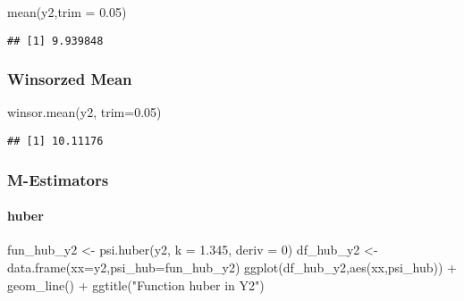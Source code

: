 \documentclass[
]{article}
\newenvironment{Shaded}{\begin{snugshade}}{\end{snugshade}}
\newcommand{\AttributeTok}[1]{\textcolor[rgb]{0.77,0.63,0.00}{#1}}
\newcommand{\DecValTok}[1]{\textcolor[rgb]{0.00,0.00,0.81}{#1}}
\newcommand{\FloatTok}[1]{\textcolor[rgb]{0.00,0.00,0.81}{#1}}
\newcommand{\FunctionTok}[1]{\textcolor[rgb]{0.00,0.00,0.00}{#1}}
\newcommand{\NormalTok}[1]{#1}
\newcommand{\OtherTok}[1]{\textcolor[rgb]{0.56,0.35,0.01}{#1}}
\newcommand{\SpecialCharTok}[1]{\textcolor[rgb]{0.00,0.00,0.00}{#1}}
\newcommand{\StringTok}[1]{\textcolor[rgb]{0.31,0.60,0.02}{#1}}
\begin{document}
\begin{Shaded}
\begin{Highlighting}[]
\FunctionTok{mean}\NormalTok{(y2,}\AttributeTok{trim =} \FloatTok{0.05}\NormalTok{)}
\end{Highlighting}
\end{Shaded}

\begin{verbatim}
## [1] 9.939848
\end{verbatim}

\hypertarget{winsorzed-mean-3}{%
\subsubsection{Winsorzed Mean}\label{winsorzed-mean-3}}

\begin{Shaded}
\begin{Highlighting}[]
\FunctionTok{winsor.mean}\NormalTok{(y2, }\AttributeTok{trim=}\FloatTok{0.05}\NormalTok{)}
\end{Highlighting}
\end{Shaded}

\begin{verbatim}
## [1] 10.11176
\end{verbatim}

\hypertarget{m-estimators-3}{%
\subsubsection{M-Estimators}\label{m-estimators-3}}

\hypertarget{huber-3}{%
\paragraph{huber}\label{huber-3}}

\begin{Shaded}
\begin{Highlighting}[]
\NormalTok{fun\_hub\_y2 }\OtherTok{\textless{}{-}} \FunctionTok{psi.huber}\NormalTok{(y2, }\AttributeTok{k =} \FloatTok{1.345}\NormalTok{, }\AttributeTok{deriv =} \DecValTok{0}\NormalTok{)}
\NormalTok{df\_hub\_y2 }\OtherTok{\textless{}{-}} \FunctionTok{data.frame}\NormalTok{(}\AttributeTok{xx=}\NormalTok{y2,}\AttributeTok{psi\_hub=}\NormalTok{fun\_hub\_y2)}
\FunctionTok{ggplot}\NormalTok{(df\_hub\_y2,}\FunctionTok{aes}\NormalTok{(xx,psi\_hub)) }\SpecialCharTok{+} 
  \FunctionTok{geom\_line}\NormalTok{() }\SpecialCharTok{+} \FunctionTok{ggtitle}\NormalTok{(}\StringTok{"Function huber in Y2"}\NormalTok{)}
\end{Highlighting}
\end{Shaded}
\end{document}

